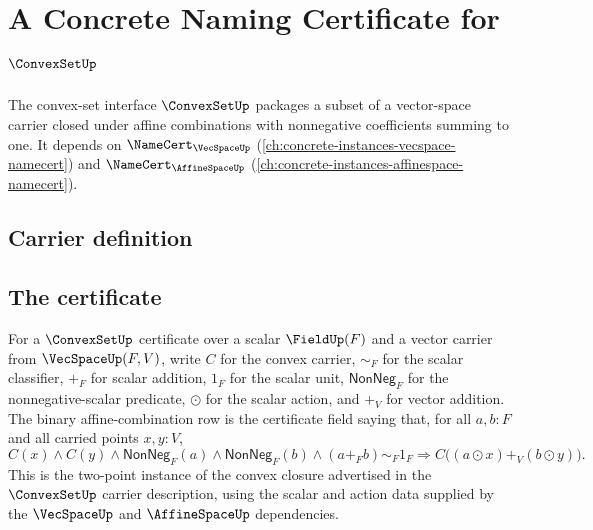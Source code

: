 \chapter{A Concrete Naming Certificate for $\ConvexSetUp$}
\label{ch:concrete-instances-convexset-namecert}

The convex-set interface $\ConvexSetUp$ packages a subset of a vector-space carrier closed under affine combinations with nonnegative coefficients summing to one. It depends on $\NameCert_{\VecSpaceUp}$ (\autoref{ch:concrete-instances-vecspace-namecert}) and $\NameCert_{\AffineSpaceUp}$ (\autoref{ch:concrete-instances-affinespace-namecert}).

\section{Carrier definition}
\label{sec:convexset-carrier}

\section{The certificate}
\label{sec:convexset-certificate}

\begin{definition}
\label{def:convexset-binary-affine-combination-row}
For a $\ConvexSetUp$ certificate over a scalar $\FieldUp(F)$ and a vector
carrier from $\VecSpaceUp(F,V)$, write $C$ for the convex carrier,
$\sim_F$ for the scalar classifier, $+_F$ for scalar addition, $1_F$ for the
scalar unit, $\mathsf{NonNeg}_F$ for the nonnegative-scalar predicate, $\odot$
for the scalar action, and $+_V$ for vector addition. The binary
affine-combination row is the certificate field saying that, for all
$a,b:F$ and all carried points $x,y:V$,
$$
C(x)\land C(y)\land \mathsf{NonNeg}_F(a)\land \mathsf{NonNeg}_F(b)
\land (a+_F b)\sim_F 1_F
\Longrightarrow
C\bigl((a\odot x)+_V(b\odot y)\bigr).
$$
This is the two-point instance of the convex closure advertised in the
$\ConvexSetUp$ carrier description, using the scalar and action data supplied
by the $\VecSpaceUp$ and $\AffineSpaceUp$ dependencies.
\end{definition}

